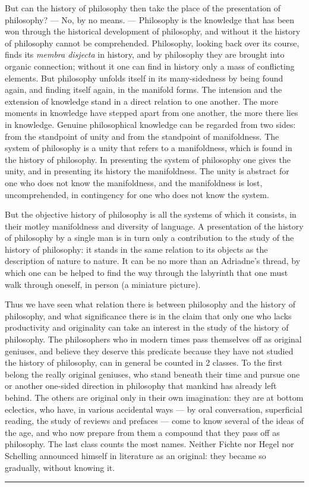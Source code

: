 \documentclass[12pt]{article}
\newcommand{\opage}[1]{\marginnote{\footnotesize\textit{[#1]}}}
\begin{document}
But can the history of philosophy then take the place of the presentation of philosophy? --- No, by no means. --- Philosophy is the knowledge that has been won through the historical development of philosophy, and without it the history of philosophy cannot be comprehended. Philosophy, looking back over its course, finds its \textit{membra disjecta} in history, and by philosophy they are brought into organic connection; without it one can find in history only a mass of conflicting elements. But philosophy unfolds itself in its many-sidedness by being found again, and finding itself again, in the manifold forms. The intension and the extension of knowledge stand in a direct relation to one another. The more moments in knowledge have stepped apart from one another, the more there lies in knowledge. Genuine philosophical knowledge can be regarded from two sides: from the standpoint of unity and from the standpoint of manifoldness. The system of philosophy is a unity that refers to a manifoldness, which is found in the history of philosophy. In presenting the system of philosophy one gives the unity, and in presenting its history the manifoldness. The unity is abstract for one who does not know the manifoldness, and the manifoldness is lost, uncomprehended, in contingency for one who does not know the system.

\opage{10r}But the objective history of philosophy is all the systems of which it consists, in their motley manifoldness and diversity of language. A presentation of the history of philosophy by a single man is in turn only a contribution to the study of the history of philosophy: it stands in the same relation to its objects as the description of nature to nature. It can be no more than an Adriadne's thread, by which one can be helped to find the way through the labyrinth that one must walk through oneself, in person (a miniature picture). %

Thus we have seen what relation there is between philosophy and the history of philosophy, and what significance there is in the claim that only one who lacks productivity and originality can take an interest in the study of the history of philosophy. The philosophers who in modern times pass themselves off as original geniuses, and believe they deserve this predicate because they have not studied the history of philosophy, can in general be counted in 2 classes. To the first belong the really original geniuses, who stand beneath their time and pursue one or another one-sided direction in philosophy that mankind has already left behind. The others are original only in their own imagination: they are at bottom eclectics, who have, in various accidental ways --- by oral conversation, superficial reading, the study of reviews and prefaces --- come to know several\opage{10v} of the ideas of the age, and who now prepare from them a compound that they pass off as philosophy. The last class counts the most names. Neither Fichte nor Hegel nor Schelling announced himself in literature as an original: they became so gradually, without knowing it.

\begin{center}\rule{0.32\textwidth}{0.4pt}\end{center}
\end{document}
